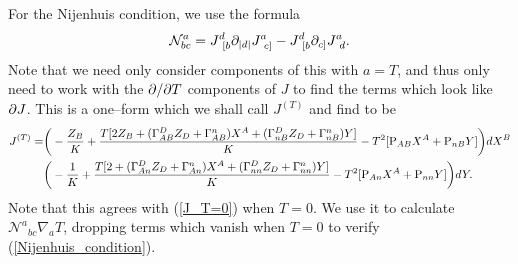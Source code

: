 For the Nijenhuis condition, we use the formula
\[
\mathcal{N}^a_{bc}=J^d_{\ [b}\p_{|d|}J^a_{\ c]}-J^d_{\ [b}\p_{c]}J^a_{\ d}.
\]
Note that we need only consider components of this with $a=T$, and thus only need to work with the $\partial/\partial T$ components of $J$ to find the terms which look like $\partial J$. This is a one--form which we shall call $J^{(T)}$ and find to be
\[
\begin{split}
J^{(T)}=&\bigg(-\frac{Z_B}{K} + \frac{T[2Z_B + (\Gamma^D_{AB}Z_D+\Gamma^n_{AB})X^A + (\Gamma^D_{nB}Z_D+\Gamma^n_{nB})Y]}{K} - T^2[\mathrm{P}_{AB}X^A+\mathrm{P}_{nB}Y]\bigg)dX^B \\
&\bigg(-\frac{1}{K} + \frac{T[2 + (\Gamma^D_{An}Z_D+\Gamma^n_{An})X^A + (\Gamma^D_{nn}Z_D+\Gamma^n_{nn})Y]}{K} - T^2[\mathrm{P}_{An}X^A+\mathrm{P}_{nn}Y]\bigg)dY.
\end{split}
\]
Note that this agrees with (\ref{J_T=0}) when $T=0$. We use it to calculate ${\mathcal{N}^{a}}_{bc}\nabla_a T$, dropping terms which vanish when $T=0$ to verify (\ref{Nijenhuis_condition}).

\koniec

